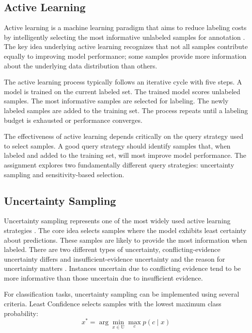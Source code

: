 \documentclass[conference]{IEEEtran}
\newcommand{\set}[1]{\mathrm{#1}}
\begin{document}
\subsection{Active Learning}

Active learning is a machine learning paradigm that aims to reduce labeling costs by intelligently selecting the most informative unlabeled samples for annotation \cite{settles2009active}. The key idea underlying active learning recognizes that not all samples contribute equally to improving model performance; some samples provide more information about the underlying data distribution than others.

The active learning process typically follows an iterative cycle with five steps. A model is trained on the current labeled set. The trained model scores unlabeled samples. The most informative samples are selected for labeling. The newly labeled samples are added to the training set. The process repeats until a labeling budget is exhausted or performance converges.

The effectiveness of active learning depends critically on the query strategy used to select samples. A good query strategy should identify samples that, when labeled and added to the training set, will most improve model performance. The assignment explores two fundamentally different query strategies: uncertainty sampling and sensitivity-based selection.

\subsection{Uncertainty Sampling}

Uncertainty sampling represents one of the most widely used active learning strategies \cite{lewis1994heterogeneous,settles2009active}. The core idea selects samples where the model exhibits least certainty about predictions. These samples are likely to provide the most information when labeled. There are two different types of uncertainty, conflicting-evidence uncertainty differs and insufficient-evidence uncertainty and the reason for uncertainty matters \cite{sharma2016evidence}. Instances uncertain due to conflicting evidence tend to be more informative than those uncertain due to insufficient evidence.

For classification tasks, uncertainty sampling can be implemented using several criteria. Least Confidence selects samples with the lowest maximum class probability:
\begin{equation}
x^* = \arg\min_{x \in \set{U}} \max_c p(c \mid x)
\end{equation}
\end{document}
